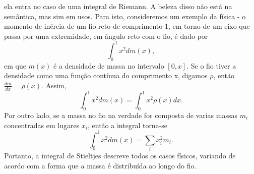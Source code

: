 \documentclass[analysis_notes.tex]{subfiles}
\begin{document}
ela entra no caso de uma integral de Riemann. A beleza disso não está na semântica, mas sim em usos. Para isto, consideremos um exemplo da física - o momento de inércia de um fio reto de comprimento 1, em torno de um eixo que passa por uma extremidade, em ângulo reto com o fio, é dado por
\[
	\int_{0}^{1}x^{2}dm(x),
\]
em que \(m(x)\) é a densidade de massa no intervalo \([0, x]\). Se o fio tiver a densidade como uma função contínua do comprimento x, digamos \(\rho \), então \(\frac{dm}{dx}=\rho(x)\). Assim,
\[
	\int_{0}^{1}x^{2}dm(x)=\int_{0}^{1}x^{2}\rho(x)dx.
\]
Por outro lado, se a massa no fio na verdade for composta de varias massas \(m_{i}\) concentradas em lugares \(x_{i}\), então a integral torna-se
\[
	\int_{0}^{1}x^{2}dm(x)=\sum\limits_{i}^{}x_{i}^{2}m_{i}.
\]
Portanto, a integral de Stieltjes descreve todos os casos físicos, variando de acordo com a forma que a massa é distribuída ao longo do fio.
\end{document}
